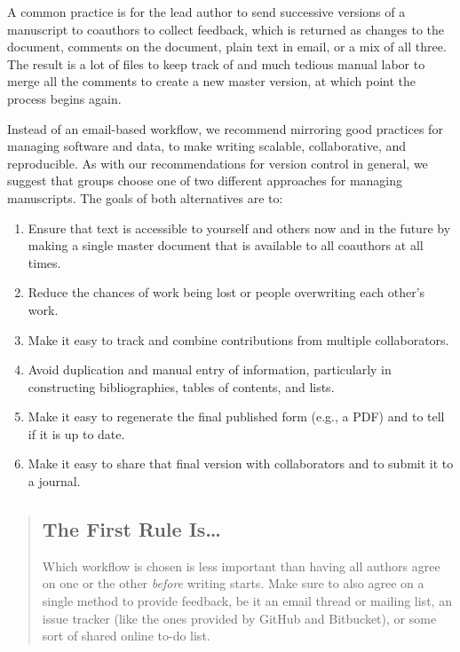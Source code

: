 \documentclass[10pt]{article}
\begin{document}
A common practice is for the lead author to send successive versions of
a manuscript to coauthors to collect feedback, which is returned as
changes to the document, comments on the document, plain text in email,
or a mix of all three. The result is a lot of files to keep track of and
much tedious manual labor to merge all the comments to create a new
master version, at which point the process begins again.

Instead of an email-based workflow, we recommend mirroring good
practices for managing software and data, to make writing scalable,
collaborative, and reproducible. As with our recommendations for version
control in general, we suggest that groups choose one of two different
approaches for managing manuscripts. The goals of both alternatives are
to:

\begin{enumerate}
\item
  Ensure that text is accessible to yourself and others now and in the
  future by making a single master document that is available to all
  coauthors at all times.
\item
  Reduce the chances of work being lost or people overwriting each
  other's work.
\item
  Make it easy to track and combine contributions from multiple
  collaborators.
\item
  Avoid duplication and manual entry of information, particularly in
  constructing bibliographies, tables of contents, and lists.
\item
  Make it easy to regenerate the final published form (e.g., a PDF) and
  to tell if it is up to date.
\item
  Make it easy to share that final version with collaborators and to
  submit it to a journal.
\end{enumerate}

\begin{quote}
\subsection*{The First Rule Is{\ldots}}

Which workflow is chosen is less important than having all authors agree
on one or the other \emph{before} writing starts. Make sure to also
agree on a single method to provide feedback, be it an email thread or
mailing list, an issue tracker (like the ones provided by GitHub and
Bitbucket), or some sort of shared online to-do list.
\end{quote}
\end{document}
